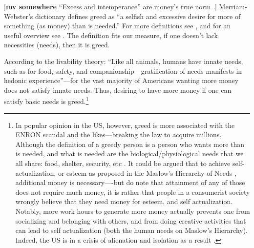 \documentclass[10pt, letterpaper]{article}
\begin{document}
\begin{spacing}{1.8}


[{\bf mv somewhere} ``Excess and intemperance'' are money's true norm \citep{marx1844-human-requirements}.]
Merriam-Webster's dictionary defines greed as ``a selfish and excessive desire for more of something (as money) than is needed.'' For more
definitions see \citet{seuntjens15b}, and for an useful overview see \citet{wang11b}. 
 The definition fits our measure, if one doesn't lack necessities (needs), then it is greed.

 According to the  livability theory:
 ``Like all animals, humans have innate needs, such as for food, safety, and companionship---gratification of needs manifests in hedonic experience''\citep{veenhoven14b}---for the vast majority of Americans wanting more money does not satisfy innate needs. Thus, desiring to have more money if one can
 satisfy basic needs is greed.\footnote{In popular opinion in the US, however,
   greed is more associated with the ENRON scandal and the likes---breaking the
   law to acquire millions. Although the definition of a greedy person is a
   person who wants more than is needed, and what is needed are the
   biological/physiological needs that we all share: food, shelter, security,
   etc \citep{veenhoven14b}. It could be argued that to achieve
   self-actualization, or esteem as proposed in the Maslow's Hierarchy of Needs \citep{maslow87}, additional money is necessary----but do note that attainment of any of those does not require much money, it is rather that people in a consumerist society wrongly believe that they need money for esteem, and self actualization. 
Notably, more work hours to generate more money actually prevents one from socializing and belonging with others, and from doing creative activities that can lead to self actualization (both the human needs on Maslow's Hierarchy). Indeed, the US is in a crisis of alienation and isolation as a result \citep{putnam01,wilkinson09}.}


\end{spacing}
\end{document}
